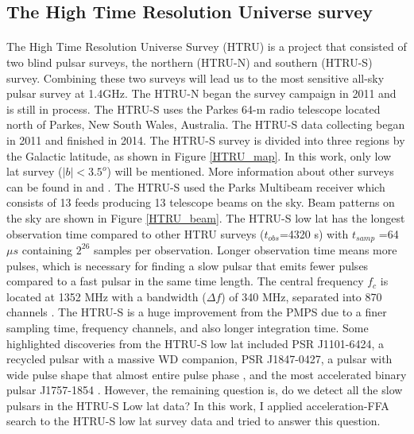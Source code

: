 \documentclass[thesis_msc.tex]{subfiles}
\begin{document}
        \subsection{The High Time Resolution Universe survey}
		\paragraph{} The High Time Resolution Universe Survey (HTRU) is a project that consisted of two blind pulsar surveys, the northern (HTRU-N) and southern (HTRU-S) survey. Combining these two surveys will lead us to the most sensitive all-sky pulsar survey at 1.4GHz. The HTRU-N began the survey campaign in 2011 and is still in process. The HTRU-S uses the Parkes 64-m radio telescope located north of Parkes, New South Wales, Australia. The HTRU-S data collecting began in 2011 and finished in 2014. The HTRU-S survey is divided into three regions by the Galactic latitude, as shown in Figure \ref{HTRU_map}. In this work, only low lat survey ($|b|<3.5^o$) will be mentioned. More information about other surveys can be found in \cite{Andrew} and \cite{keith2010high}. The HTRU-S used the Parks Multibeam receiver which consists of 13 feeds producing 13 telescope beams on the sky. Beam patterns on the sky are shown in Figure \ref{HTRU_beam}.  The HTRU-S low lat has the longest observation time compared to other HTRU surveys ($t_{obs}$=4320 s) with $t_{samp}$ =64 $\mu s$ containing $2^{26}$ samples per observation. Longer observation time means more pulses, which is necessary for finding a slow pulsar that emits fewer pulses compared to a fast pulsar in the same time length. The central frequency $f_c$ is located at 1352 MHz with a bandwidth ($\Delta f$) of 340 MHz, separated into 870 channels \citep{keith2010high}. The HTRU-S is a huge improvement from the PMPS due to a finer sampling time, frequency channels, and also longer integration time. Some highlighted discoveries from the HTRU-S low lat included PSR J1101-6424, a recycled pulsar with a massive WD companion, PSR J1847-0427, a pulsar with wide pulse shape that almost entire pulse phase \citep{ng2015high}, and the most accelerated binary pulsar J1757-1854 \citep{cameron2018high}. However, the remaining question is, do we detect all the slow pulsars in the HTRU-S Low lat data? In this work, I applied acceleration-FFA search to the HTRU-S low lat survey data and tried to answer this question. %
        
\end{document}
